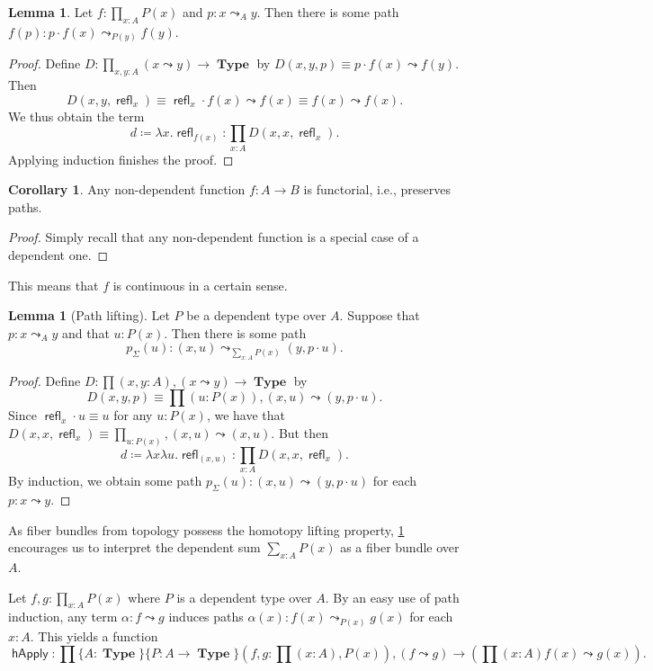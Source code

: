\documentclass[10pt,letterpaper,cm]{nupset}
\theoremstyle{definition}
\theoremstyle{theorem}
\newtheorem{lemma}[definition]{Lemma}
\newtheorem{corollary}[definition]{Corollary}
\theoremstyle{remark}
\newcommand{\1}{\mathbf{1}}
\newcommand{\0}{\vec 0}
\DeclareMathOperator{\refl}{\mathsf{refl}}
\DeclareMathOperator{\happly}{\mathsf{hApply}}
\DeclareMathOperator{\type}{\mathbf{Type}}
\begin{document}
\begin{lemma}\label{LL}
Let $f: \prod_{x:A}P(x)$ and $p: x\leadsto_A y$. Then there is some path $f(p):p \cdot f(x) \leadsto_{P(y)} f(y)$.
\end{lemma}
\begin{proof}
Define $D: \prod_{x,y:A}(x\leadsto y) \to \type$ by  $D(x,y,p) \equiv p\cdot f(x) \leadsto f(y)$. Then $$D(x,y,\refl_x) \equiv \refl_x \cdot f(x) \leadsto f(x) \equiv f(x) \leadsto f(x).$$ We thus obtain the term $$ d\coloneqq \lambda x.\refl_{f(x)}: \prod_{x:A}D(x,x,\refl_x).$$ Applying induction finishes the proof.
\end{proof}

\begin{corollary}
Any non-dependent function $f: A \to B$ is functorial, i.e., preserves paths.
\end{corollary}
\begin{proof}
Simply recall that any non-dependent function is a special case of a dependent one.
\end{proof}

This means that $f$ is continuous in a certain sense.

\smallskip

\begin{lemma}[Path lifting]
Let $P$ be a dependent type over $A$. Suppose that $p: x\leadsto_A y$ and that $u: P(x)$. Then there is some path $$p_{\Sigma}(u) : (x, u) \leadsto_{\sum_{x:A}P(x)} (y, p\cdot u).$$
\end{lemma}
\begin{proof}
Define $D: \prod (x,y:A), (x\leadsto y) \to \type$ by  $$D(x,y,p) \equiv \prod(u:P(x)), (x,u) \leadsto (y, p\cdot u).$$ Since $\refl_x \cdot u \equiv u$ for any $u: P(x)$, we have that $D(x, x, \refl_x) \equiv \prod_{u:P(x)}, (x,u) \leadsto (x,u)$. But then $$ d\coloneqq\lambda x\lambda u. \refl_{(x,u)} : \prod_{x:A} D(x,x, \refl_x) .$$ By induction, we obtain some path $p_{\Sigma}(u) : (x,u)\leadsto (y, p \cdot u)$ for each $p: x\leadsto y$.
\end{proof}

As fiber bundles from topology possess the homotopy lifting property,  \cref{LL} encourages us to interpret the dependent sum $\sum_{x:A}P(x)$ as a fiber bundle over $A$.


Let $f,g: \prod_{x:A} P(x)$ where $P$ is a dependent type over $A$. By an easy use of path induction, any term $\alpha : f \leadsto g$ induces paths $\alpha(x) :f(x) \leadsto_{P(x)} g(x)$ for each $x:A$. This yields a function $$\happly : \prod \{A :\type\}\{P: A \to \type\}\left(f,g: \prod(x:A), P(x)\right), (f\leadsto g) \to \left(\prod(x:A) f(x)\leadsto g(x) \right).$$
\end{document}
